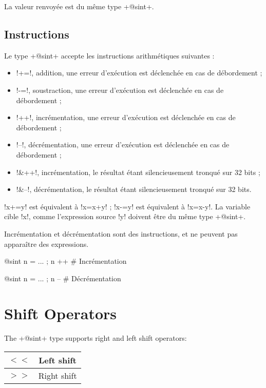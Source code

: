 La valeur renvoyée est du même type  \ggs+@sint+.


\subsection{Instructions}

Le type \ggs+@sint+ accepte les instructions arithmétiques suivantes :
\begin{itemize}
  \item \ggs!+=!, addition, une erreur d'exécution est déclenchée en cas de débordement ;
  \item \ggs!-=!, soustraction, une erreur d'exécution est déclenchée en cas de débordement ;
  \item \ggs!++!, incrémentation, une erreur d'exécution est déclenchée en cas de débordement ;
  \item \ggs!--!, décrémentation, une erreur d'exécution est déclenchée en cas de débordement ;
  \item \ggs!&++!, incrémentation, le résultat étant silencieusement tronqué sur 32 bits ;
  \item \ggs!&--!, décrémentation, le résultat étant silencieusement tronqué sur 32 bits.
\end{itemize}

\ggs!x+=y! est équivalent à \ggs!x=x+y! ; \ggs!x-=y! est équivalent à \ggs!x=x-y!.
La variable cible \ggs!x!, comme l'expression source \ggs!y! doivent être du même type \ggs+@sint+. 

Incrémentation et décrémentation sont des instructions, et ne peuvent pas apparaître des expressions.
\begin{galgas}
@sint n = ... ; n ++ # Incrémentation
\end{galgas}

\begin{galgas}
@sint n = ... ; n -- # Décrémentation
\end{galgas}







\section{Shift Operators}


The \ggs+@sint+ type supports right and left shift operators:\newline

\begin{tabular}{|c|c|}
\hline
$<<$ & Left shift \\
\hline
$>>$ & Right shift \\
\hline
\end{tabular}

